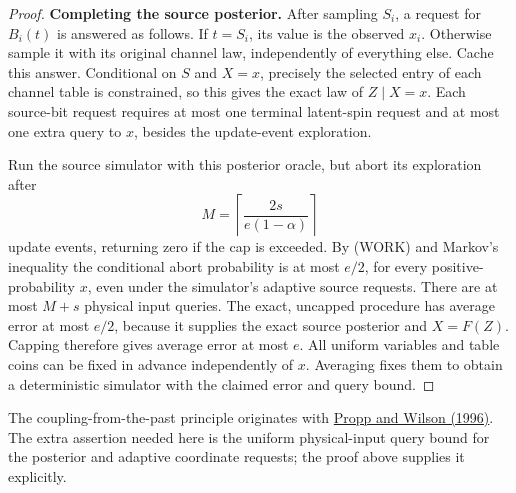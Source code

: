 \begin{proof}
\textbf{Completing the source posterior.}
After sampling \(S_i\), a request for \(B_i(t)\) is answered as
follows. If \(t=S_i\), its value is the observed \(x_i\). Otherwise
sample it with its original channel law, independently of everything
else. Cache this answer. Conditional on \(S\) and \(X=x\), precisely
the selected entry of each channel table is constrained, so this gives
the exact law of \(Z\mid X=x\). Each source-bit request requires
at most one terminal latent-spin request and at most one extra query
to \(x\), besides the update-event exploration.

Run the source simulator with this posterior oracle, but abort its
exploration after
\[
 M=\left\lceil\frac{2s}{e(1-\alpha)}\right\rceil
\]
update events, returning zero if the cap is exceeded. By (WORK) and
Markov's inequality the conditional abort probability is at most
\(e/2\), for every positive-probability \(x\), even under the
simulator's adaptive source requests. There are at most \(M+s\)
physical input queries. The exact, uncapped procedure has average
error at most \(e/2\), because it supplies the exact source posterior
and \(X=F(Z)\). Capping therefore gives average error at most \(e\).
All uniform variables and table coins can be fixed in advance
independently of \(x\). Averaging fixes them to obtain a deterministic
simulator with the claimed error and query bound.
\end{proof}

The coupling-from-the-past principle originates with
\href{https://www.stat.berkeley.edu/~aldous/206-RWG/RWGpapers/propp_wilson.pdf}
{Propp and Wilson (1996)}. The extra assertion needed here is the
uniform physical-input query bound for the posterior and adaptive
coordinate requests; the proof above supplies it explicitly.
